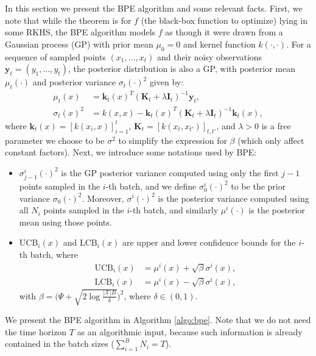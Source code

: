 \documentclass[10pt]{article}
\begin{document}
In this section we present the BPE algorithm \citep{Li22} and some relevant facts.
First, we note that while the theorem is for $f$ (the black-box function to optimize) lying in some RKHS, the BPE algorithm models $f$ as though it were drawn from a Gaussian process (GP) with prior mean $\mu_0=0$ and kernel function $k(\cdot,\cdot)$.
For a sequence of sampled points $(x_1,\ldots, x_t)$ and their noisy observations $\mathbf{y}_t = (y_1,\ldots, y_t)$, the posterior distribution is also a GP, with posterior mean $\mu_t(\cdot)$ and posterior variance $\sigma_t(\cdot)^2$ given by:
\begin{align}
    \mu_t(x) & = \mathbf{k}_t(x)^T(\mathbf{K}_t+\lambda \mathbf{I}_t)^{-1}\mathbf{y}_t, \\
    \sigma_t(x)^2 & = k(x,x) - \mathbf{k}_t(x)^T(\mathbf{K}_t+\lambda \mathbf{I}_t)^{-1}\mathbf{k}_t(x),
\end{align}
where $\mathbf{k}_t(x) = [k(x_i,x)]_{i=1}^t $, $\mathbf{K}_t = [k(x_t,x_{t'})]_{t,t'} $, and $\lambda>0$ is a free parameter we choose to be $\sigma^2$ to simplify the expression for $\beta$ (which only affect constant factors).
Next, we introduce some notations used by BPE:
\begin{itemize}
    \item $\sigma^i_{j-1}(\cdot)^2$ is the GP posterior variance computed using only the first $j-1$ points sampled in the $i$-th batch, and we define $\sigma^i_{0}(\cdot)^2$ to be the prior variance $\sigma_0(\cdot)^2$. Moreover, $\sigma^i(\cdot)^2$ is the posterior variance computed using all $N_i$ points sampled in the $i$-th batch, and similarly $\mu^i(\cdot)$ is the posterior mean using those points. 
    \item $\mathrm{UCB}_i(x)$ and $\mathrm{LCB}_i(x)$ are upper and lower confidence bounds for the $i$-th batch, where
    \begin{align}
        \mathrm{UCB}_i(x) & = \mu^{i}(x) + \sqrt{\beta}\sigma^{i}(x), \\
        \mathrm{LCB}_i(x) & = \mu^{i}(x) - \sqrt{\beta}\sigma^{i}(x),
    \end{align}
    with $\beta = \bigl( \Psi + \sqrt{2 \log \frac{|\mathcal{X}| B}{\delta}} \bigr)^2$, where $\delta \in (0,1)$.     
\end{itemize}
We present the BPE algorithm in Algorithm \ref{algo:bpe}. Note that we do not need the time horizon $T$ as an algorithmic input, because such information is already contained in the batch sizes ($\sum_{i=1}^B N_i=T$).
\end{document}
